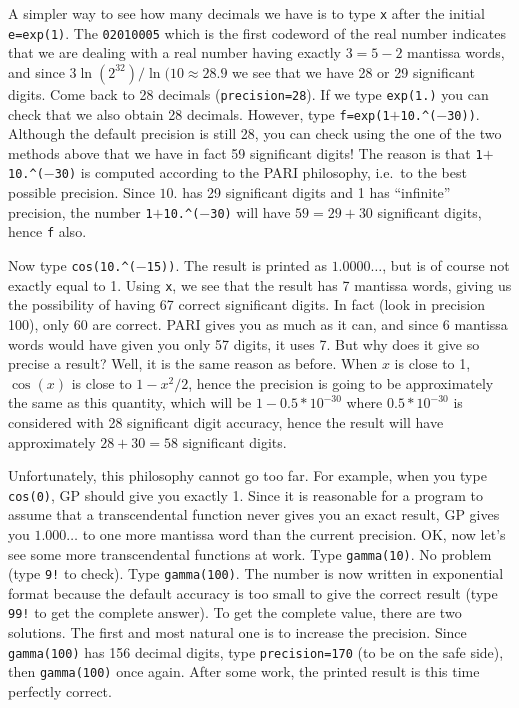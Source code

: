 A simpler way to see how many decimals we have is to type {\tt\bs x} after
the initial {\tt e=exp(1)}. The {\tt 02010005} which is the first codeword
of the real number indicates that we are dealing with a real number having
exactly $3=5-2$ mantissa words, and since $3\ln(2^32)/\ln(10\approx28.9$
we see that we have 28 or 29 significant digits.
\smallskip
Come back to 28 decimals ({\tt\bs precision=28}). If we type {\tt exp(1.)}
you can check that we also obtain 28 decimals. However, type 
{\tt f=exp(1$+$10.\^{}($-$30))}. Although the default precision is still 28,
you can check using the one of the two methods above that we have in fact 59
significant digits! The reason is that {\tt 1$+$10.\^{}($-$30)} is computed
according to the PARI philosophy, i.e.~to the best possible precision. Since
$10.$ has 29 significant digits and 1 has ``infinite'' precision, the number
{\tt 1$+$10.\^{}($-$30)} will have $59=29+30$ significant digits, hence {\tt f}
also.

Now type {\tt cos(10.\^{}($-$15))}. The result is printed as $1.0000\dots$,
but is of course not exactly equal to 1. Using {\tt\bs x}, we see that the
result has 7 mantissa words, giving us the possibility of having 67 
correct significant digits. In fact (look in precision 100), only 60 are 
correct. PARI gives you as much as it can, and since 6 mantissa words
would have given you only 57 digits, it uses 7. But why does it give so
precise a result? Well, it is the same reason as before. When $x$ is close
to 1, $\cos(x)$ is close to $1-x^2/2$, hence the precision is going to be
approximately the same as this quantity, which will be $1-0.5*10^{-30}$ where
$0.5*10^{-30}$ is considered with 28 significant digit accuracy, hence the
result will have approximately $28+30=58$ significant digits.

Unfortunately, this philosophy cannot go too far. For example, when you
type {\tt cos(0)}, GP should give you exactly 1. Since it is reasonable for
a program to assume that a transcendental function never gives you an exact
result, GP gives you $1.000\dots$ to one more mantissa word than the current
precision.
\medskip
OK, now let's see some more transcendental functions at work. Type
{\tt gamma(10)}. No problem (type {\tt 9!} to check). Type {\tt gamma(100)}.
The number is now written in exponential format because the default
accuracy is too small to give the correct result (type {\tt 99!} to get the 
complete answer).
To get the complete value, there are two solutions. The first and most natural
one is to increase the precision. Since {\tt gamma(100)} has 156 decimal
digits, type {\tt\bs precision=170} (to be on the safe side), then
{\tt gamma(100)} once again. After some work, the printed result is this time
perfectly correct.

